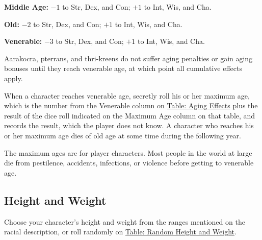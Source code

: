 \begin{itemize*}
\item \textbf{Middle Age:} $-1$ to Str, Dex, and Con; $+1$ to Int, Wis, and Cha.
\item \textbf{Old:} $-2$ to Str, Dex, and Con; $+1$ to Int, Wis, and Cha.
\item \textbf{Venerable:} $-3$ to Str, Dex, and Con; $+1$ to Int, Wis, and Cha.
\end{itemize*}

Aarakocra, pterrans, and thri-kreens do not suffer aging penalties or gain aging bonuses until they reach venerable age, at which point all cumulative effects apply.

When a character reaches venerable age, secretly roll his or her maximum age, which is the number from the Venerable column on \hyperref[tab:Aging Effects]{Table: Aging Effects} plus the result of the dice roll indicated on the Maximum Age column on that table, and records the result, which the player does not know. A character who reaches his or her maximum age dies of old age at some time during the following year.

The maximum ages are for player characters. Most people in the world at large die from pestilence, accidents, infections, or violence before getting to venerable age.


\subsection{Height and Weight}
Choose your character's height and weight from the ranges mentioned on the racial description, or roll randomly on \hyperref[tab:Random Height and Weight]{Table: Random Height and Weight}.

